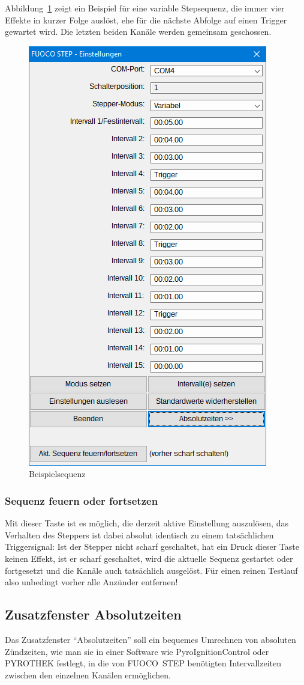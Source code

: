 \documentclass[paper=a4, open=any, numbers=noenddot]{scrbook}
\begin{document}
					Abbildung~\ref{fig:beispielsequenz} zeigt ein Beispiel für eine variable Stepsequenz, die immer vier Effekte in kurzer Folge auslöst, ehe für die nächste Abfolge auf einen Trigger gewartet wird. Die letzten beiden Kanäle werden gemeinsam geschossen.

					\begin{figure}[tb]
						\centering\includegraphics[width=.5\textwidth]{beispielshow}
						\caption{Beispielsequenz}
						\label{fig:beispielsequenz}
					\end{figure}
				
				\subsubsection*{Sequenz feuern oder fortsetzen}
					
					Mit dieser Taste ist es möglich, die derzeit aktive Einstellung auszulösen, das Verhalten des Steppers ist dabei absolut identisch zu einem tatsächlichen Triggersignal: Ist der Stepper nicht scharf geschaltet, hat ein Druck dieser Taste keinen Effekt, ist er scharf geschaltet, wird die aktuelle Sequenz gestartet oder fortgesetzt und die Kanäle auch tatsächlich ausgelöst. Für einen reinen Testlauf also unbedingt vorher alle Anzünder entfernen!

			\subsection{Zusatzfenster Absolutzeiten}
				\label{sec:absolutzeiten}
				Das Zusatzfenster \enquote{Absolutzeiten} soll ein bequemes Umrechnen von absoluten Zündzeiten, wie man sie in einer Software wie PyroIgnitionControl oder PYROTHEK festlegt, in die von FUOCO~STEP benötigten Intervallzeiten zwischen den einzelnen Kanälen ermöglichen.
\end{document}
